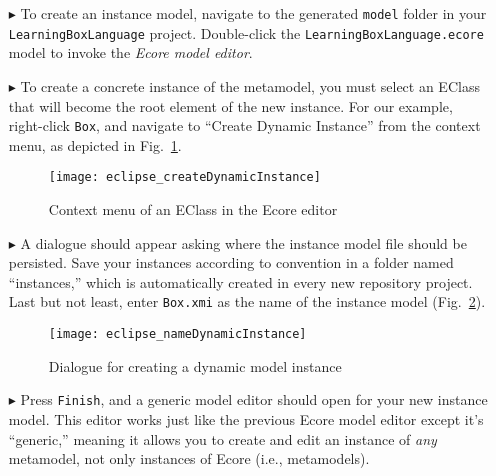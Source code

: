 \begin{itemize}

\item[$\blacktriangleright$] To create an instance model, navigate to the generated \texttt{model} folder in your \texttt{LearningBoxLanguage} project.
Double-click the \texttt{LearningBoxLa\-nguage.ecore} model to invoke  the \emph{Ecore model editor}. 

\vspace{0.5cm}

\item[$\blacktriangleright$] To create a concrete instance of the metamodel, you must select an EClass that will become the root element of the new instance.
For our example, right-click \texttt{Box}, and navigate to ``Create Dynamic Instance'' from the context menu, as depicted in Fig.~\ref{fig:context_menu}.

\begin{figure}[htbp]
	\centering
  \texttt{[image: eclipse\_createDynamicInstance]}
	\caption{Context menu of an EClass in the Ecore editor}
	\label{fig:context_menu}
\end{figure}

\vspace{0.5cm}

\item[$\blacktriangleright$] A dialogue should appear asking where the instance model file should be persisted. Save your instances according to convention in a
folder named ``instances,'' which is automatically created in every new repository project. Last but not least, enter \texttt{Box.xmi} as the name of the
instance model (Fig.~\ref{eclipse:store_dynamic_instance}).

\vspace{0.5cm}

\begin{figure}[htbp]
	\centering
  \texttt{[image: eclipse\_nameDynamicInstance]}
	\caption{Dialogue for creating a dynamic model instance}
	\label{eclipse:store_dynamic_instance}
\end{figure}

\item[$\blacktriangleright$] Press \texttt{Finish}, and a generic model editor should open for your new instance model. This editor works just like the
previous Ecore model editor except it's ``generic,'' meaning it allows you to create and edit an instance of \emph{any} metamodel, not only instances of Ecore
(i.e., metamodels).


\end{itemize}
